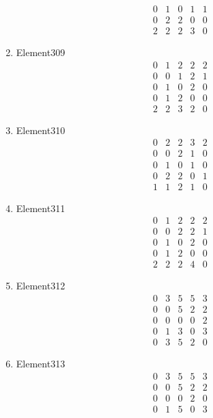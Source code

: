\documentclass[12pt]{article}
\begin{document}
\begin{multicols}{3}
\begin{enumerate}
\begin{equation*}
\begin{array}{ccccc}
0&1&0&1&1\\
0&2&2&0&0\\
2&2&2&3&0
\end{array}
\end{equation*}
\item Element309
\begin{equation*}
\begin{array}{ccccc}
0&1&2&2&2\\
0&0&1&2&1\\
0&1&0&2&0\\
0&1&2&0&0\\
2&2&3&2&0
\end{array}
\end{equation*}
\item Element310
\begin{equation*}
\begin{array}{ccccc}
0&2&2&3&2\\
0&0&2&1&0\\
0&1&0&1&0\\
0&2&2&0&1\\
1&1&2&1&0
\end{array}
\end{equation*}
\item Element311
\begin{equation*}
\begin{array}{ccccc}
0&1&2&2&2\\
0&0&2&2&1\\
0&1&0&2&0\\
0&1&2&0&0\\
2&2&2&4&0
\end{array}
\end{equation*}
\item Element312
\begin{equation*}
\begin{array}{ccccc}
0&3&5&5&3\\
0&0&5&2&2\\
0&0&0&0&2\\
0&1&3&0&3\\
0&3&5&2&0
\end{array}
\end{equation*}
\item Element313
\begin{equation*}
\begin{array}{ccccc}
0&3&5&5&3\\
0&0&5&2&2\\
0&0&0&2&0\\
0&1&5&0&3\\

\end{array}
\end{equation*}
\end{enumerate}
\end{multicols}
\end{document}
